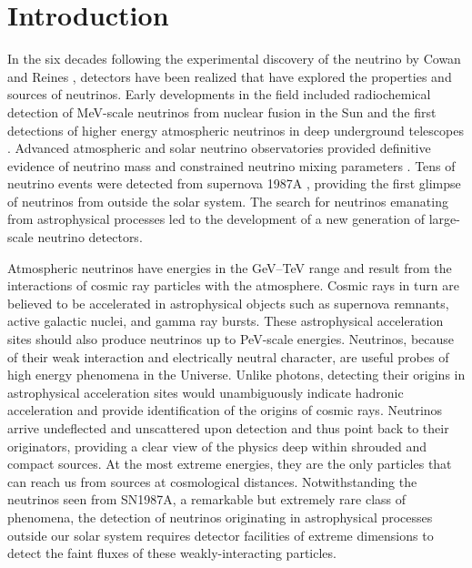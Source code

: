
\section{Introduction}
\label{sec:intro}

In the six decades following the experimental
discovery of the neutrino by Cowan and Reines \cite{reines1960detection}, detectors have been realized
that have explored the properties and sources of neutrinos. Early developments in the field included 
radiochemical detection of MeV-scale neutrinos from
nuclear fusion in the Sun \cite{Homestake} and the first detections of
higher energy
atmospheric neutrinos in deep underground telescopes
\cite{Achar,Witwatersrand}. Advanced
atmospheric and solar neutrino observatories provided definitive
evidence of neutrino mass and constrained neutrino mixing
parameters \cite{SK,SNO}. Tens of neutrino
events were detected from supernova 1987A
\cite{SK1987A,IMB1987A,BUST1987A}, providing the first glimpse of neutrinos
from outside the solar system. The search for neutrinos emanating from astrophysical
processes led to the development of a new generation of large-scale neutrino detectors. 

Atmospheric neutrinos have energies in the GeV--TeV range and result from the interactions of cosmic ray
particles with the atmosphere. Cosmic rays in turn are
believed to be accelerated in astrophysical objects such as supernova
remnants, active galactic nuclei, and gamma ray bursts. These
astrophysical acceleration sites should also produce neutrinos up to 
PeV-scale energies. Neutrinos, because of their weak interaction and electrically neutral character, are useful probes of high
energy phenomena in the Universe. Unlike photons, detecting their origins in astrophysical
acceleration sites would unambiguously indicate hadronic acceleration and
provide identification of the origins of cosmic rays. Neutrinos arrive 
undeflected and unscattered upon detection and thus point back to their
originators, providing
a clear view of the physics deep within shrouded and compact sources. At
the most extreme energies, they are the only particles that can reach 
us from sources at cosmological distances. Notwithstanding the neutrinos seen from SN1987A, a remarkable but
extremely rare class of phenomena, the detection of neutrinos originating in
astrophysical processes outside our solar system requires detector facilities of
extreme dimensions to detect the faint fluxes of these weakly-interacting
particles. 

